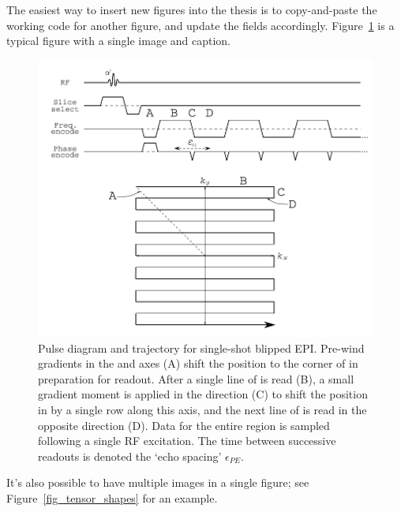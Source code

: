 The easiest way to insert new figures into the thesis is to copy-and-paste the working code for another figure, and update the fields accordingly. Figure~\ref{fig_epi_blipped} is a typical figure with a single image and caption. %
%
\begin{figure}[p]
  \centering
  \includegraphics[width=\textwidth]{images/sequences/blipped_epi.pdf}
  \caption[Pulse diagram and \kspace trajectory for single-shot blipped EPI]%
  {Pulse diagram and \kspace trajectory for single-shot blipped EPI. Pre-wind gradients in the \fe and \pe axes (A) shift the \kspace position to the corner of \kspace in preparation for readout. After a single line of \kspace is read (B), a small gradient moment is applied in the \pe direction (C) to shift the position in \kspace by a single row along this axis, and the next line of \kspace is read in the opposite direction (D). Data for the entire \kspace region is sampled following a single RF excitation. The time between successive readouts is denoted the `echo spacing' $\epsilon_{PE}$.}
  \label{fig_epi_blipped}
\end{figure}%
%
It's also possible to have multiple images in a single figure; see Figure~\ref{fig_tensor_shapes} for an example.
%
